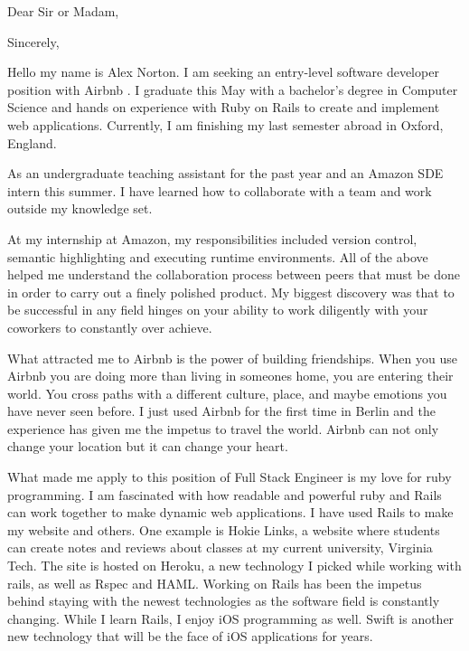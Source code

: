 \documentclass{my_cv}
\begin{document}
\newcommand{\companyName}{Airbnb } %
\recipient{\companyName \ Recruitment team}{\companyName }
\date{\today}
\opening{Dear Sir or Madam,}
\closing{Sincerely,}
\makelettertitle


\indent Hello my name is Alex Norton.   I am seeking an entry-level software developer
position with \companyName.   I graduate this May with a bachelor’s degree in
Computer Science and hands on experience with Ruby on Rails to create and
implement web applications.  Currently, I am finishing my last semester abroad
in Oxford, England. 

As an undergraduate teaching assistant for the past year and an Amazon SDE
intern this summer.  I have learned how to collaborate with a team and work
outside my knowledge set.

At my internship at Amazon, my responsibilities included version control,
semantic highlighting and executing runtime environments.  All of the above
helped me understand the collaboration process between peers that must be
done in order to carry out a finely polished product.  My biggest discovery
was that to be successful in any field hinges on your ability to work
diligently with your coworkers to constantly over achieve.

What attracted me to \companyName is the power of building friendships.  When
you use \companyName you are doing more than living in someones home, you are
entering their world.  You cross paths with a different culture, place, and
maybe emotions you have never seen before.  I just used \companyName for the
first time in Berlin and the experience has given me the impetus to travel the
world.  \companyName can not only change your location but it can change your
heart.

What made me apply to this position of Full Stack Engineer  is my love for ruby programming.  I
am fascinated with how readable and powerful ruby and Rails can work together to
make dynamic web applications.  I have used Rails to make my website and others.
One example is Hokie Links, a website where students can create notes and
reviews about classes at my current university, Virginia Tech.  The site is
hosted on Heroku, a new technology I picked while working with rails, as well as
Rspec and HAML.  Working on Rails has been the impetus behind staying with
the newest technologies as the software field is constantly changing.  While I
learn Rails, I enjoy iOS programming as well.  Swift is another new technology that
will be the face of iOS applications for years.
\end{document}
